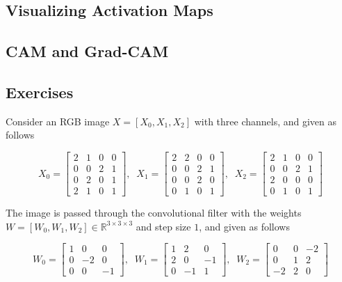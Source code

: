 \subsection{Visualizing Activation Maps}

  \subsection{CAM and Grad-CAM}


\subsection{Exercises}

  \begin{example}
    Consider an RGB image $X = [X_0, X_1, X_2]$ with three channels, and given as follows 

    \begin{equation}
      X_0 = \begin{bmatrix} 2 & 1 & 0 & 0 \\ 0 & 0 & 2 & 1 \\ 0 & 2 & 0 & 1 \\ 2 & 1 & 0 & 1 \end{bmatrix}, \;\; 
      X_1 = \begin{bmatrix} 2 & 2 & 0 & 0 \\ 0 & 0 & 2 & 1 \\ 0 & 0 & 2 & 0 \\ 0 & 1 & 0 & 1 \end{bmatrix}, \;\; 
      X_2 = \begin{bmatrix} 2 & 1 & 0 & 0 \\ 0 & 0 & 2 & 1 \\ 2 & 0 & 0 & 0 \\ 0 & 1 & 0 & 1 \end{bmatrix}
      \label{eq:tarokh_conv_exercise}
    \end{equation}
    
    The image is passed through the convolutional filter with the weights $W = [W_0, W_1, W_2] \in \mathbb{R}^{3 \times 3 \times 3}$ and step size $1$, and given as follows 

    \begin{equation}
      W_0 = \begin{bmatrix} 1 & 0 & 0 \\ 0 & -2 & 0 \\ 0 & 0 & -1 \end{bmatrix}, \;\; 
      W_1 = \begin{bmatrix} 1 & 2 & 0 \\ 2 & 0 & - 1 \\ 0 & -1 & 1 \end{bmatrix}, \;\; 
      W_2 = \begin{bmatrix} 0 & 0 & -2 \\ 0 & 1 & 2 \\ -2 & 2 & 0 \end{bmatrix} 
      \label{eq:tarokh_conv_exercise2}
    \end{equation}   


\end{example}
